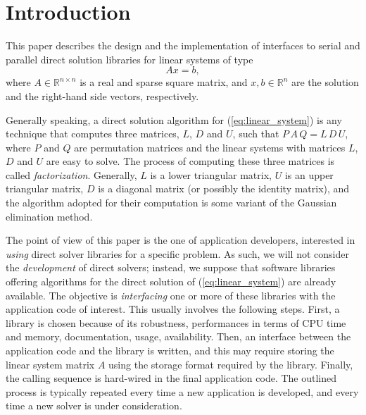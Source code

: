 \documentclass{llncs}
\begin{document}
\section{Introduction}
\label{sec:introduction}

This paper describes the design and the implementation of 
interfaces to serial and parallel direct solution libraries for
linear systems of type
\begin{equation}
  \label{eq:linear_system}
  A x = b,
\end{equation}
where $A \in \mathbb{R}^{n \times n}$ is a real and sparse square matrix, 
  and $x, b \in \mathbb{R}^{n}$ are the solution and
the right-hand side vectors, respectively. 

Generally speaking,
a direct solution algorithm for (\ref{eq:linear_system}) is any 
technique that computes three matrices, $L$, $D$ and $U$, such that
$P\, A\, Q = L \, D \, U$, where $P$ and $Q$ are permutation matrices
and the linear systems with matrices $L$, $D$ and $U$ are
easy to solve.
The process of computing these three matrices is called {\sl
  factorization}. Generally, $L$ is a lower triangular matrix, $U$ is an
upper triangular matrix, $D$ is a diagonal matrix 
(or possibly the identity matrix), and the algorithm adopted for their
computation is some variant of the Gaussian elimination method.

The point of view of this paper is the one of application developers, interested
in {\sl using} direct solver libraries for a specific problem. As such, we
will not consider the {\sl development} of direct solvers; instead, we suppose that software
libraries offering algorithms for the direct solution of
(\ref{eq:linear_system}) are already available. The objective is {\sl
interfacing} one or more of these libraries with the application code of
interest.  This usually involves the following steps. First, a library is chosen
because of its robustness, performances in terms of CPU time and memory,
documentation, usage, availability. Then, an interface between the application
code and the library is written, and this may require storing the linear
system matrix $A$ using the storage format required by the library. Finally, 
the calling sequence is hard-wired in the final application code.
The outlined process is typically repeated every time a new application is
developed, and every time a new solver is under consideration. 
\end{document}
